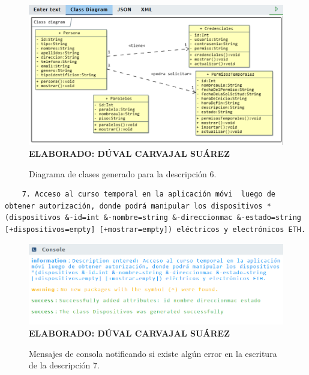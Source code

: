  \begin{figure}[H]
 	\caption{Diagrama de clases generado para la descripción 6.}
 	\includegraphics[width=15cm]{img/dc-eva-006.png}
 	\label{fig:dc_eva_006}
 	\textbf{\\ ELABORADO: DÚVAL CARVAJAL SUÁREZ}
 \end{figure}
 
  \begin{lstlisting}
 	7. Acceso al curso temporal en la aplicación móvi  luego de obtener autorización, donde podrá manipular los dispositivos *(dispositivos &-id=int &-nombre=string &-direccionmac &-estado=string [+dispositivos=empty] [+mostrar=empty]) eléctricos y electrónicos ETH. \end{lstlisting}
 
     \begin{figure}[h!]
 	\caption{Mensajes de consola notificando si existe algún error en la escritura de la descripción 7.}
 	\includegraphics[width=14cm]{img/not-eva-007.png}
 	\label{fig:not_eva_007}
 	\textbf{\\ ELABORADO: DÚVAL CARVAJAL SUÁREZ}
 \end{figure}
 
